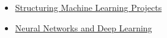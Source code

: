 \documentclass[11pt,a4paper,sans]{moderncv} %
\begin{document}
	\begin{multicols}{2}
		\begin{itemize}
		    \item {} \href{https://www.coursera.org/account/accomplishments/certificate/27H94GEHRAKE}{Structuring Machine Learning Projects}
		      \vspace{0.5em}
		    \item {}
		    \href{https://www.coursera.org/account/accomplishments/certificate/JKQ3Y88ZWKP9}{Neural Networks and Deep Learning}
		
		
			
			
			
			
			

\end{itemize}
\end{multicols}
\end{document}
